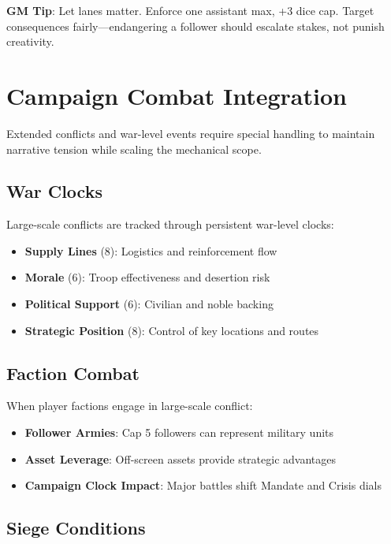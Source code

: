 \textbf{GM Tip}: Let lanes matter. Enforce one assistant max, +3 dice cap. Target consequences fairly—endangering a follower should escalate stakes, not punish creativity.

\section*{Campaign Combat Integration}

Extended conflicts and war-level events require special handling to maintain narrative tension while scaling the mechanical scope.

\subsection*{War Clocks}

Large-scale conflicts are tracked through persistent war-level clocks:

\begin{itemize}
    \item \textbf{Supply Lines} (8): Logistics and reinforcement flow
    \item \textbf{Morale} (6): Troop effectiveness and desertion risk
    \item \textbf{Political Support} (6): Civilian and noble backing
    \item \textbf{Strategic Position} (8): Control of key locations and routes
\end{itemize}

\subsection*{Faction Combat}

When player factions engage in large-scale conflict:

\begin{itemize}
    \item \textbf{Follower Armies}: Cap 5 followers can represent military units
    \item \textbf{Asset Leverage}: Off-screen assets provide strategic advantages
    \item \textbf{Campaign Clock Impact}: Major battles shift Mandate and Crisis dials
\end{itemize}

\subsection*{Siege Conditions}

